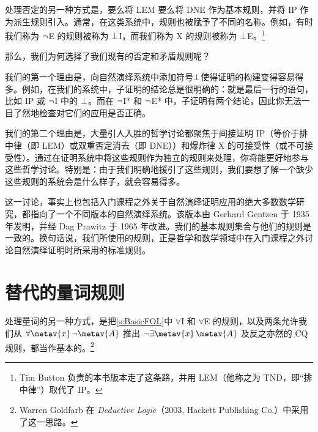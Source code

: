 处理否定的另一种方式是，要么将 LEM 要么将 DNE 作为基本规则，并将 IP 作为派生规则引入。通常，在这类系统中，规则也被赋予了不同的名称。例如，有时我们称为 $\neg$E 的规则被称为 $\bot$I，而我们称为 X 的规则被称为 $\bot$E。\footnote{Tim Button 负责的本书版本走了这条路，并用 LEM（他称之为 TND，即“排中律”）取代了 IP。}

那么，我们为何选择了我们现有的否定和矛盾规则呢？

我们的第一个理由是，向自然演绎系统中添加符号$\bot$使得证明的构建变得容易得多。例如，在我们的系统中，子证明的结论总是很明确的：就是最后一行的语句，比如 IP 或 $\neg$I 中的 $\bot$。而在 $\neg$I* 和 $\neg$E* 中，子证明有两个结论，因此你无法一目了然地检查对它们的应用是否正确。

我们的第二个理由是，大量引人入胜的哲学讨论都聚焦于间接证明 IP（等价于排中律（即 LEM）或双重否定消去（即 DNE））和爆炸律 X 的可接受性（或不可接受性）。通过在证明系统中将这些规则作为独立的规则来处理，你将能更好地参与这些哲学讨论。特别是：由于我们明确地援引了这些规则，我们要想了解一个缺少这些规则的系统会是什么样子，就会容易得多。

这一讨论，事实上也包括入门课程之外关于自然演绎证明应用的绝大多数数学研究，都指向了一个不同版本的自然演绎系统。该版本由 Gerhard Gentzen 于 1935 年发明，并经 Dag Prawitz 于 1965 年改进。我们的基本规则集合与他们的规则是一致的。换句话说，我们所使用的规则，正是哲学和数学领域中在入门课程之外讨论自然演绎证明时所采用的标准规则。



\section{替代的量词规则}
处理量词的另一种方式，是把\cref{s:BasicFOL}中 $\forall$I 和 $\forall$E 的规则，以及两条允许我们从 $\forall \metav{x}\, \enot \metav{A}$ 推出 $\enot \exists \metav{x}\, \metav{A}$ 及反之亦然的 CQ 规则，都当作基本的。\footnote{Warren Goldfarb 在 \textit{Deductive Logic}（2003, Hackett Publishing Co.）中采用了这一思路。}

